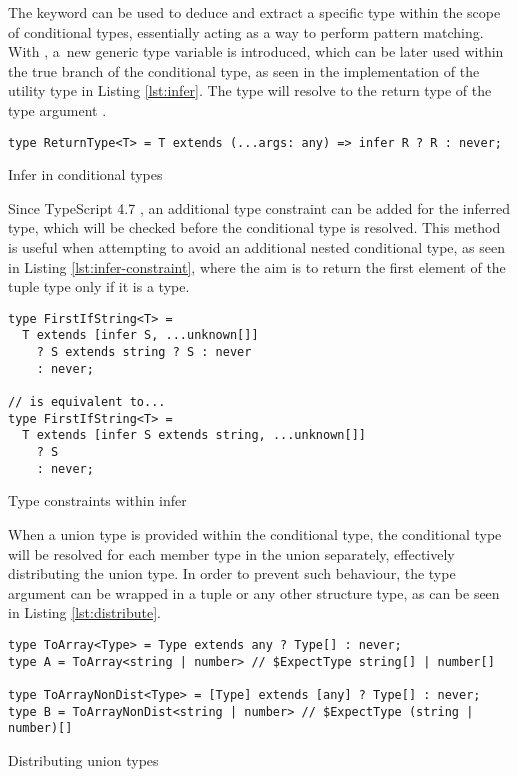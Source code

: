The  keyword can be used to deduce and extract a specific type within the scope of conditional types, essentially acting as a way to perform pattern matching. With , a~new generic type variable is introduced, which can be later used within the true branch of the conditional type, as seen in the implementation of the  utility type in Listing \ref{lst:infer}. The  type will resolve to the return type of the type argument .

\begin{listing}[ht]
  \begin{verbatim}
type ReturnType<T> = T extends (...args: any) => infer R ? R : never;
\end{verbatim}
  \caption{Infer in conditional types}\label{lst:infer}
\end{listing}

Since TypeScript 4.7 \cite{AnnouncingTypeScript4.7}, an additional type constraint can be added for the inferred type, which will be checked before the conditional type is resolved. This method is useful when attempting to avoid an additional nested conditional type, as seen in Listing \ref{lst:infer-constraint}, where the aim is to return the first element of the tuple type only if it is a  type.

\begin{listing}[ht]
  \begin{verbatim}
type FirstIfString<T> =
  T extends [infer S, ...unknown[]]
    ? S extends string ? S : never
    : never;

// is equivalent to...
type FirstIfString<T> =
  T extends [infer S extends string, ...unknown[]]
    ? S
    : never;
\end{verbatim}
  \caption{Type constraints within infer}\label{lst:infer-constraint}
\end{listing}

When a union type is provided within the conditional type, the conditional type will be resolved for each member type in the union separately, effectively distributing the union type. In order to prevent such behaviour, the type argument can be wrapped in a tuple or any other structure type, as can be seen in Listing \ref{lst:distribute}.

\begin{listing}[ht]
  \begin{verbatim}
type ToArray<Type> = Type extends any ? Type[] : never;
type A = ToArray<string | number> // $ExpectType string[] | number[]

type ToArrayNonDist<Type> = [Type] extends [any] ? Type[] : never;
type B = ToArrayNonDist<string | number> // $ExpectType (string | number)[]
\end{verbatim}
  \caption{Distributing union types}\label{lst:distribute}
\end{listing}

